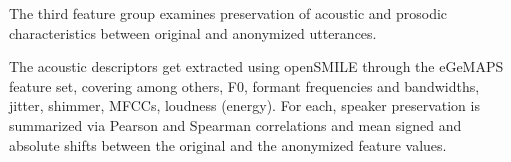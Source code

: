 \documentclass[12pt,leqno,a4paper]{article}
\begin{document}




The third feature group examines preservation of acoustic and prosodic characteristics between original and anonymized utterances.

The acoustic descriptors get extracted using openSMILE  \citep{10.1145/1873951.1874246} through the eGeMAPS \citep{eyben_geneva_2016} feature set, 
covering among others, F0, formant frequencies and bandwidths, jitter, shimmer, MFCCs, loudness (energy). For each, speaker preservation is summarized via Pearson and Spearman correlations and mean signed and absolute shifts between the original and the anonymized feature values.
\end{document}
